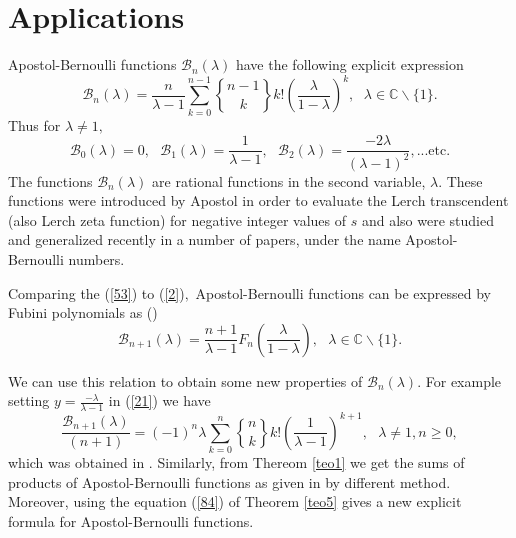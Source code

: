\documentclass{article}%
\providecommand{\U}[1]{\protect\rule{.1in}{.1in}}
\begin{document}
\section{Applications}

Apostol-Bernoulli functions $\mathcal{B}_{n}\left(  \lambda\right)  $ have the
following explicit expression
\begin{equation}
\mathcal{B}_{n}\left(  \lambda\right)  =\frac{n}{\lambda-1}\sum_{k=0}^{n-1}%
\genfrac{\{}{\}}{0pt}{}{n-1}{k}%
k!\left(  \frac{\lambda}{1-\lambda}\right)  ^{k},\,\ \ \lambda\in%
\mathbb{C}
\backslash\{1\}. \label{53}%
\end{equation}
Thus for $\lambda\neq1,$
\[
\mathcal{B}_{0}\left(  \lambda\right)  =0,\text{ }\mathcal{B}_{1}\left(
\lambda\right)  =\frac{1}{\lambda-1},\text{ }\mathcal{B}_{2}\left(
\lambda\right)  =\frac{-2\lambda}{\left(  \lambda-1\right)  ^{2}%
},...\text{etc.}%
\]
The functions $\mathcal{B}_{n}\left(  \lambda\right)  $ are rational functions
in the second variable, $\lambda$. These functions were introduced by Apostol
\cite{APOSTOL} in order to evaluate the Lerch transcendent (also Lerch zeta
function) for negative integer values of $s$ and also were studied and
generalized recently in a number of papers, under the name Apostol-Bernoulli numbers.

Comparing the (\ref{53}) to (\ref{2})$,$ Apostol-Bernoulli functions can be
expressed by Fubini polynomials as (\cite{B3})%
\begin{equation}
\mathcal{B}_{n+1}\left(  \lambda\right)  =\frac{n+1}{\lambda-1}F_{n}\left(
\frac{\lambda}{1-\lambda}\right)  ,\text{ \ \ \ }\lambda\in%
\mathbb{C}
\backslash\{1\}. \label{22}%
\end{equation}


We can use this relation to obtain some new properties of $\mathcal{B}%
_{n}\left(  \lambda\right)  .$ For example setting $y=\frac{-\lambda}%
{\lambda-1}$ in (\ref{21}) we have
\[
\frac{\mathcal{B}_{n+1}\left(  \lambda\right)  }{\left(  n+1\right)  }=\left(
-1\right)  ^{n}\lambda\sum_{k=0}^{n}%
\genfrac{\{}{\}}{0pt}{}{n}{k}%
k!\left(  \frac{1}{\lambda-1}\right)  ^{k+1},\text{ \ }\lambda\neq1,\text{
}n\geq0,
\]
which was obtained in \cite[Thereom 4.3]{GuoandQi}. Similarly, from Thereom
\ref{teo1} we get the sums of products of Apostol-Bernoulli functions as given
in \cite[Corollary 1.3]{KimandHu} by different method. Moreover, using the
equation (\ref{84}) of Theorem \ref{teo5} gives a new explicit formula for
Apostol-Bernoulli functions.
\end{document}
